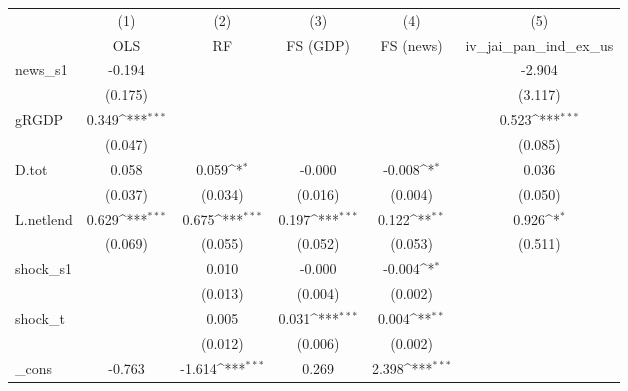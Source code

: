 {
\def\sym#1{\ifmmode^{#1}\else\(^{#1}\)\fi}
\begin{tabular}{l*{5}{c}}
\toprule
            &\multicolumn{1}{c}{(1)}&\multicolumn{1}{c}{(2)}&\multicolumn{1}{c}{(3)}&\multicolumn{1}{c}{(4)}&\multicolumn{1}{c}{(5)}\\
            &\multicolumn{1}{c}{OLS}&\multicolumn{1}{c}{RF}&\multicolumn{1}{c}{FS (GDP)}&\multicolumn{1}{c}{FS (news)}&\multicolumn{1}{c}{iv\_jai\_pan\_ind\_ex\_us}\\
\midrule
news\_s1     &      -0.194         &                     &                     &                     &      -2.904         \\
            &     (0.175)         &                     &                     &                     &     (3.117)         \\
\addlinespace
gRGDP       &       0.349\sym{***}&                     &                     &                     &       0.523\sym{***}\\
            &     (0.047)         &                     &                     &                     &     (0.085)         \\
\addlinespace
D.tot       &       0.058         &       0.059\sym{*}  &      -0.000         &      -0.008\sym{*}  &       0.036         \\
            &     (0.037)         &     (0.034)         &     (0.016)         &     (0.004)         &     (0.050)         \\
\addlinespace
L.netlend   &       0.629\sym{***}&       0.675\sym{***}&       0.197\sym{***}&       0.122\sym{**} &       0.926\sym{*}  \\
            &     (0.069)         &     (0.055)         &     (0.052)         &     (0.053)         &     (0.511)         \\
\addlinespace
shock\_s1    &                     &       0.010         &      -0.000         &      -0.004\sym{*}  &                     \\
            &                     &     (0.013)         &     (0.004)         &     (0.002)         &                     \\
\addlinespace
shock\_t     &                     &       0.005         &       0.031\sym{***}&       0.004\sym{**} &                     \\
            &                     &     (0.012)         &     (0.006)         &     (0.002)         &                     \\
\addlinespace
\_cons      &      -0.763         &      -1.614\sym{***}&       0.269         &       2.398\sym{***}&                     \\

\end{tabular}}
